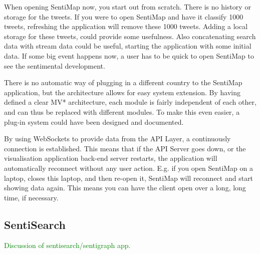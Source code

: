 When opening SentiMap now, you start out from scratch. There is no history or storage for the tweets. If you were to open SentiMap and have it classify 1000 tweets, refreshing the application will remove these 1000 tweets. Adding a local storage for these tweets, could provide some usefulness. Also concatenating search data with stream data could be useful, starting the application with some initial data. If some big event happens now, a user has to be quick to open SentiMap to see the sentimental development. 

There is no automatic way of plugging in a different country to the SentiMap application, but the architecture allows for easy system extension. By having defined a clear MV* architecture, each module is fairly independent of each other, and can thus be replaced with different modules. To make this even easier, a plug-in system could have been designed and documented. 

By using WebSockets to provide data from the API Layer, a continuously connection is established. This means that if the API Server goes down, or the visualisation application back-end server restarts, the application will automatically reconnect without any user action. E.g. if you open SentiMap on a laptop, closes this laptop, and then re-open it, SentiMap will reconnect and start showing data again. This means you can have the client open over a long, long time, if necessary.   

\subsection{SentiSearch}

\textcolor{green}{Discussion of sentisearch/sentigraph app.}


